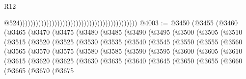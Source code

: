 \begin{lexlean}{R12}
\begin{coremodule}
                                                                                            @524))))))))))))))))))))))))))))))))))))))))))))
@4003 := @3450
    (@3455
      (@3460
        (@3465
          (@3470
            (@3475
              (@3480
                (@3485
                  (@3490
                    (@3495
                      (@3500
                        (@3505
                          (@3510
                            (@3515
                              (@3520
                                (@3525
                                  (@3530
                                    (@3535
                                      (@3540
                                        (@3545
                                          (@3550
                                            (@3555
                                              (@3560
                                                (@3565
                                                  (@3570
                                                    (@3575
                                                      (@3580
                                                        (@3585
                                                          (@3590
                                                            (@3595
                                                              (@3600
                                                                (@3605
                                                                  (@3610
                                                                    (@3615
                                                                      (@3620
                                                                        (@3625
                                                                          (@3630
                                                                            (@3635
                                                                              (@3640
                                                                                (@3645
                                                                                  (@3650
                                                                                    (@3655
                                                                                      (@3660
                                                                                        (@3665
                                                                                          (@3670
                                                                                            (@3675

\end{coremodule}
\end{lexlean}
